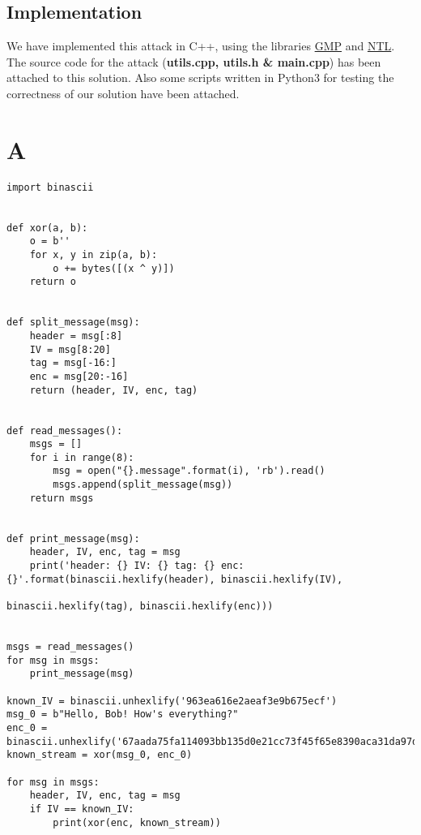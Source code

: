\documentclass[11pt]{llncs}
\begin{document}
\newpage
\subsection{Implementation}
We have implemented this attack in C++, using the libraries \href{https://gmplib.org/}{GMP} and \href{https://www.shoup.net/ntl/}{NTL}. The source code for the attack (\textbf{utils.cpp, utils.h \& main.cpp}) has been attached to this solution. Also some scripts written in Python3 for testing the correctness of our solution have been attached.
\appendix
\section{A}
\label{A}
\begin{lstlisting}
import binascii


def xor(a, b):
    o = b''
    for x, y in zip(a, b):
        o += bytes([(x ^ y)])
    return o


def split_message(msg):
    header = msg[:8]
    IV = msg[8:20]
    tag = msg[-16:]
    enc = msg[20:-16]
    return (header, IV, enc, tag)


def read_messages():
    msgs = []
    for i in range(8):
        msg = open("{}.message".format(i), 'rb').read()
        msgs.append(split_message(msg))
    return msgs


def print_message(msg):
    header, IV, enc, tag = msg
    print('header: {} IV: {} tag: {} enc: {}'.format(binascii.hexlify(header), binascii.hexlify(IV),
                                                     binascii.hexlify(tag), binascii.hexlify(enc)))


msgs = read_messages()
for msg in msgs:
    print_message(msg)

known_IV = binascii.unhexlify('963ea616e2aeaf3e9b675ecf')
msg_0 = b"Hello, Bob! How's everything?"
enc_0 = binascii.unhexlify('67aada75fa114093bb135d0e21cc73f45f65e8390aca31da97d68ab436')
known_stream = xor(msg_0, enc_0)

for msg in msgs:
    header, IV, enc, tag = msg
    if IV == known_IV:
        print(xor(enc, known_stream))
\end{lstlisting}
\end{document}
